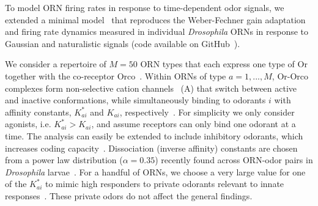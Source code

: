\documentclass[9pt,lineno]{elife}
\begin{document}
To model ORN firing rates in response to time-dependent odor signals, we extended a minimal model~\citep{srinivas_elife} that reproduces the Weber-Fechner gain adaptation and firing rate dynamics measured in individual \textit{Drosophila} ORNs in response to Gaussian and naturalistic signals (code available on GitHub~\citep{code}). 

We consider a repertoire of $M=50$ ORN types that each express one type of Or together with the co-receptor Orco~\citep{Orco}. Within ORNs of type $a=1,...,M$, Or-Orco complexes form non-selective cation channels~\citep{orco_structure} (A) that switch between active and inactive conformations, while simultaneously binding to odorants $i$ with affinity constants, $K^*_{ai}$ and $K_{ai}$, respectively~\citep{nagel_wilson_biophysical,srinivas_elife}. For simplicity we only consider agonists, i.e. $K^*_{ai} > K_{ai}$, and assume receptors can only bind one odorant at a time. The analysis can easily be extended to include inhibitory odorants, which increases coding capacity~\citep{Cao_Tu_WL}. Dissociation (inverse affinity) constants are chosen from a power law distribution ($\alpha = 0.35$) recently found across ORN-odor pairs in \textit{Drosophila} larvae~\citep{si2017invariances}. For a handful of ORNs, we choose a very large value for one of the $K^*_{ai}$ to mimic high responders to private odorants relevant to innate responses~\citep{geosmin}. These private odors do not affect the general findings. 
\end{document}
